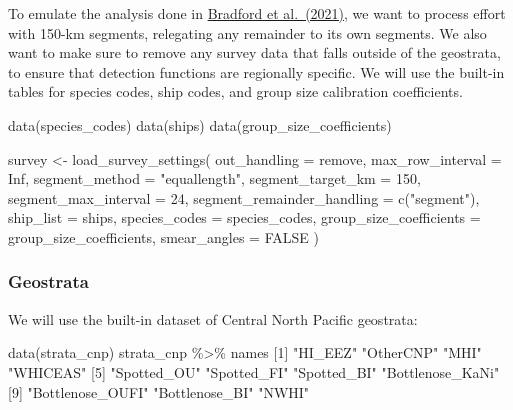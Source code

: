 \documentclass[
]{book}
\newenvironment{Shaded}{\begin{snugshade}}{\end{snugshade}}
\newcommand{\AttributeTok}[1]{\textcolor[rgb]{0.77,0.63,0.00}{#1}}
\newcommand{\ConstantTok}[1]{\textcolor[rgb]{0.00,0.00,0.00}{#1}}
\newcommand{\DecValTok}[1]{\textcolor[rgb]{0.00,0.00,0.81}{#1}}
\newcommand{\FunctionTok}[1]{\textcolor[rgb]{0.00,0.00,0.00}{#1}}
\newcommand{\NormalTok}[1]{#1}
\newcommand{\OtherTok}[1]{\textcolor[rgb]{0.56,0.35,0.01}{#1}}
\newcommand{\SpecialCharTok}[1]{\textcolor[rgb]{0.00,0.00,0.00}{#1}}
\newcommand{\StringTok}[1]{\textcolor[rgb]{0.31,0.60,0.02}{#1}}
\begin{document}
To emulate the analysis done in \href{https://repository.library.noaa.gov/view/noaa/47788}{Bradford et al.~(2021)}, we want to process effort with 150-km segments, relegating any remainder to its own segments. We also want to make sure to remove any survey data that falls outside of the geostrata, to ensure that detection functions are regionally specific. We will use the built-in tables for species codes, ship codes, and group size calibration coefficients.

\begin{Shaded}
\begin{Highlighting}[]
\FunctionTok{data}\NormalTok{(species\_codes)}
\FunctionTok{data}\NormalTok{(ships)}
\FunctionTok{data}\NormalTok{(group\_size\_coefficients)}

\NormalTok{survey }\OtherTok{\textless{}{-}} \FunctionTok{load\_survey\_settings}\NormalTok{(}
  \AttributeTok{out\_handling =} \StringTok{\textquotesingle{}remove\textquotesingle{}}\NormalTok{,}
  \AttributeTok{max\_row\_interval =} \ConstantTok{Inf}\NormalTok{,}
  \AttributeTok{segment\_method =} \StringTok{"equallength"}\NormalTok{,}
  \AttributeTok{segment\_target\_km =} \DecValTok{150}\NormalTok{,}
  \AttributeTok{segment\_max\_interval =} \DecValTok{24}\NormalTok{,}
  \AttributeTok{segment\_remainder\_handling =} \FunctionTok{c}\NormalTok{(}\StringTok{"segment"}\NormalTok{),}
  \AttributeTok{ship\_list =}\NormalTok{ ships,}
  \AttributeTok{species\_codes =}\NormalTok{ species\_codes,}
  \AttributeTok{group\_size\_coefficients =}\NormalTok{ group\_size\_coefficients,}
  \AttributeTok{smear\_angles =} \ConstantTok{FALSE}
\NormalTok{)}
\end{Highlighting}
\end{Shaded}

\hypertarget{geostrata}{%
\subsubsection*{Geostrata}\label{geostrata}}

We will use the built-in dataset of Central North Pacific geostrata:

\begin{Shaded}
\begin{Highlighting}[]
\FunctionTok{data}\NormalTok{(strata\_cnp)}
\NormalTok{strata\_cnp }\SpecialCharTok{\%\textgreater{}\%}\NormalTok{ names}
\NormalTok{ [}\DecValTok{1}\NormalTok{] }\StringTok{"HI\_EEZ"}          \StringTok{"OtherCNP"}        \StringTok{"MHI"}             \StringTok{"WHICEAS"}        
\NormalTok{ [}\DecValTok{5}\NormalTok{] }\StringTok{"Spotted\_OU"}      \StringTok{"Spotted\_FI"}      \StringTok{"Spotted\_BI"}      \StringTok{"Bottlenose\_KaNi"}
\NormalTok{ [}\DecValTok{9}\NormalTok{] }\StringTok{"Bottlenose\_OUFI"} \StringTok{"Bottlenose\_BI"}   \StringTok{"NWHI"}           
\end{Highlighting}
\end{Shaded}
\end{document}
